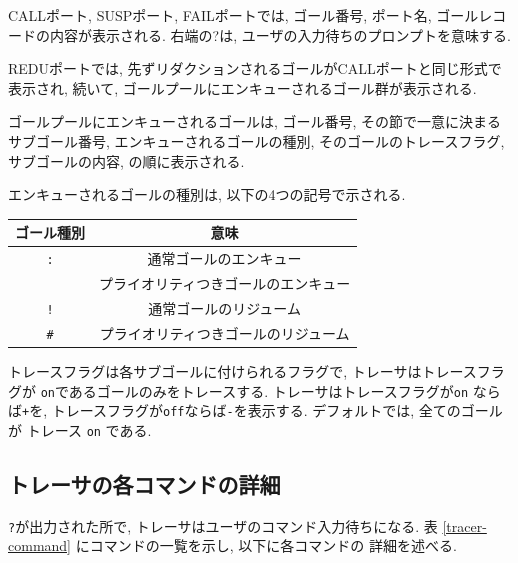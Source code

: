 \documentclass[a4,titlepage]{jsreport}
\begin{document}
CALLポート, SUSPポート, FAILポートでは, ゴール番号, ポート名, 
ゴールレコードの内容が表示される.  
右端の?は, ユーザの入力待ちのプロンプトを意味する.  

REDUポートでは, 先ずリダクションされるゴールがCALLポートと同じ形式で表示され, 
続いて, ゴールプールにエンキューされるゴール群が表示される.  

ゴールプールにエンキューされるゴールは, 
ゴール番号, その節で一意に決まるサブゴール番号, エンキューされるゴールの種別, 
そのゴールのトレースフラグ, サブゴールの内容, の順に表示される.  

エンキューされるゴールの種別は, 以下の4つの記号で示される.  

\vspace{3mm}
\begin{center}
\begin{tabular}{c|c} \hline
ゴール種別 & 意味 \\ \hline
{\tt :}& 通常ゴールのエンキュー\\
{\tt *}& プライオリティつきゴールのエンキュー\\
{\tt !}& 通常ゴールのリジューム\\
{\tt \#}& プライオリティつきゴールのリジューム\\ \hline
\end{tabular}
\end{center}
\vspace{3mm}

トレースフラグは各サブゴールに付けられるフラグで, トレーサはトレースフラグが
{\tt on}であるゴールのみをトレースする.  トレーサはトレースフラグが{\tt on}
ならば{\tt +}を, トレースフラグが{\tt off}ならば{\tt -}を表示する.  
デフォルトでは, 全てのゴールが トレース {\tt on} である.  

\subsection{トレーサの各コマンドの詳細}

{\tt ?}が出力された所で, トレーサはユーザのコマンド入力待ちになる.  
表 \ref{tracer-command}
にコマンドの一覧を示し, 以下に各コマンドの
詳細を述べる.  
\end{document}
